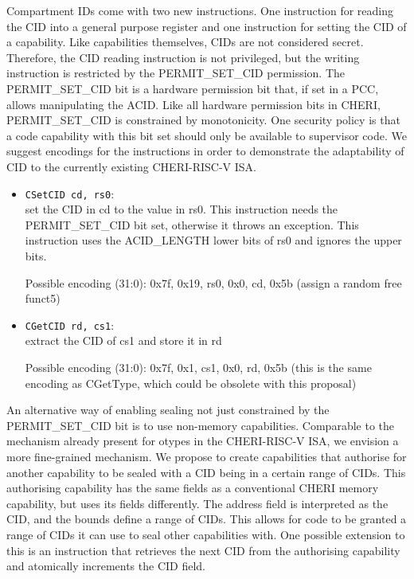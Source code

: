 Compartment IDs come with two new instructions.
One instruction for reading the CID into a general purpose register and one instruction for setting the CID of a capability.
Like capabilities themselves, CIDs are not considered secret.
Therefore, the CID reading instruction is not privileged, but the writing instruction is restricted by the PERMIT\_SET\_CID permission.
The PERMIT\_SET\_CID bit is a hardware permission bit that, if set in a PCC, allows manipulating the ACID.
Like all hardware permission bits in CHERI, PERMIT\_SET\_CID is constrained by monotonicity.
One security policy is that a code capability with this bit set should only be available to supervisor code.
We suggest encodings for the instructions in order to demonstrate the adaptability of CID to the currently existing CHERI-RISC-V ISA.

\begin{itemize}
\item \texttt{CSetCID cd, rs0}:\\
set the CID in cd to the value in rs0.
This instruction needs the PERMIT\_SET\_CID bit set, otherwise it throws an exception.
This instruction uses the ACID\_LENGTH lower bits of rs0 and ignores the upper bits.

Possible encoding (31:0): 0x7f, 0x19, rs0, 0x0, cd, 0x5b (assign a random free funct5)

\item \texttt{CGetCID rd, cs1}:\\
extract the CID of cs1 and store it in rd

Possible encoding (31:0): 0x7f, 0x1, cs1, 0x0, rd, 0x5b (this is the same encoding as CGetType, which could be obsolete with this proposal)
\end{itemize}

An alternative way of enabling sealing not just constrained by the PERMIT\_SET\_CID bit is to use non-memory capabilities.
Comparable to the mechanism already present for otypes in the CHERI-RISC-V ISA, we envision a more fine-grained mechanism.
We propose to create capabilities that authorise for another capability to be sealed with a CID being in a certain range of CIDs.
This authorising capability has the same fields as a conventional CHERI memory capability, but uses its fields differently.
The address field is interpreted as the CID, and the bounds define a range of CIDs.
This allows for code to be granted a range of CIDs it can use to seal other capabilities with.
One possible extension to this is an instruction that retrieves the next CID from the authorising capability and atomically increments the CID field.


